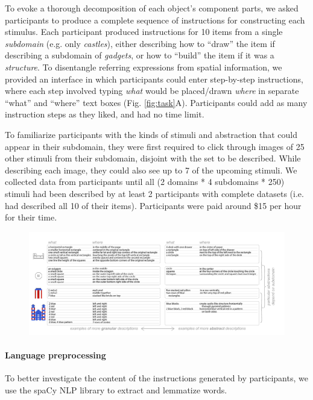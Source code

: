 \documentclass[10pt,letterpaper]{article}
\begin{document}
To evoke a thorough decomposition of each object's component parts, we asked participants to produce a complete sequence of instructions for constructing each stimulus.
Each participant produced instructions for 10 items from a single \textit{subdomain} (e.g. only \textit{castles}), either describing how to ``draw'' the item if describing a subdomain of \textit{gadgets}, or how to ``build'' the item if it was a \textit{structure}.
To disentangle referring expressions from spatial information, we provided an interface in which participants could enter step-by-step instructions, where each step involved typing \textit{what} would be placed/drawn \textit{where} in separate ``what'' and ``where'' text boxes (Fig. \ref{fig:task}A).
Participants could add as many instruction steps as they liked, and had no time limit.

To familiarize participants with the kinds of stimuli and abstraction that could appear in their subdomain, they were first required to click through images of 25 other stimuli from their subdomain, disjoint with the set to be described. 
While describing each image, they could also see up to 7 of the upcoming stimuli.
We collected data from participants until all (2 domains * 4 subdomains * 250) stimuli had been described by at least 2 participants with complete datasets (i.e. had described all 10 of their items).
Participants were paid around \$15 per hour for their time. 

\begin{figure}
  \begin{center}
  \includegraphics[width=0.99\linewidth]{figures/instruction_examples.pdf}
  \caption{}
  \label{fig:intruction_examples}
  \end{center}
  \end{figure}

\paragraph{Language preprocessing} %
To better investigate the content of the instructions generated by participants, we use the spaCy NLP library to extract and lemmatize words. %
\end{document}
